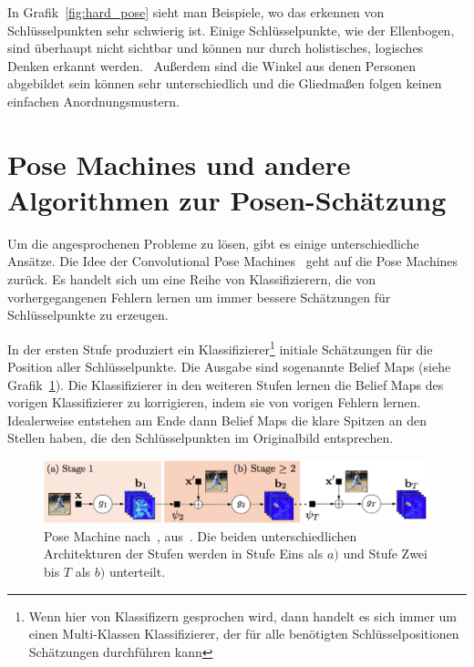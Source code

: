 \documentclass[journal, a4paper]{IEEEtran}
\begin{document}
        In Grafik~\ref{fig:hard_pose} sieht man Beispiele, wo das erkennen von Schlüsselpunkten sehr schwierig ist. Einige Schlüsselpunkte, wie der Ellenbogen, sind überhaupt nicht sichtbar und können nur durch holistisches, logisches Denken erkannt werden.~\cite{DeepPose: Human Pose Estimation via Deep Neural Networks} Außerdem sind die Winkel aus denen Personen abgebildet sein können sehr unterschiedlich und die Gliedmaßen folgen keinen einfachen Anordnungsmustern.


\section{Pose Machines und andere Algorithmen zur Posen-Schätzung}
        Um die angesprochenen Probleme zu lösen, gibt es einige unterschiedliche Ansätze. %
        Die Idee der Convolutional Pose Machines~\cite{conv_pose} geht auf die Pose Machines~\cite{ramakrishna2014pose} zurück. Es handelt sich um eine Reihe von Klassifizierern, die von vorhergegangenen Fehlern lernen um immer bessere Schätzungen für Schlüsselpunkte zu erzeugen. 

        In der ersten Stufe produziert ein Klassifizierer\footnote{Wenn hier von Klassifizern gesprochen wird, dann handelt es sich immer um einen Multi-Klassen Klassifizierer, der für alle benötigten Schlüsselpositionen Schätzungen durchführen kann} initiale Schätzungen für die Position aller Schlüsselpunkte. Die Ausgabe sind sogenannte Belief Maps (siehe Grafik~\ref{fig:pose_machine}). Die Klassifizierer in den weiteren Stufen lernen die Belief Maps des vorigen Klassifizierer zu korrigieren, indem sie von vorigen Fehlern lernen. Idealerweise entstehen am Ende dann Belief Maps die klare Spitzen an den Stellen haben, die den Schlüsselpunkten im Originalbild entsprechen.

        \begin{figure}[!hbt]
                \begin{center}
                \includegraphics[width=1\columnwidth]{pose_machine.png}
                \caption{Pose Machine nach~\cite{ramakrishna2014pose}, aus~\cite{conv_pose}. Die beiden unterschiedlichen Architekturen der Stufen werden in Stufe Eins als $a)$ und Stufe Zwei bis $T$ als $b)$ unterteilt.}
                \label{fig:pose_machine}
                
                \end{center}
        \end{figure}
\end{document}
